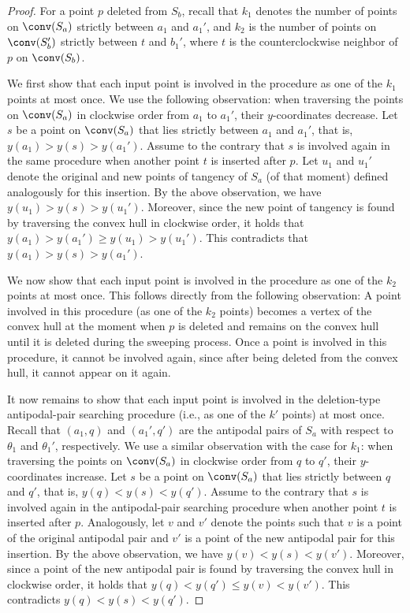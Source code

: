 \begin{proof}
    For a point $p$ deleted from $S_b$, recall that $k_1$ denotes the number of points on $\conv(S_a)$ strictly between $a_1$ and $a_1'$, and $k_2$ is the number of points on $\conv(S_b')$ strictly between $t$ and $b_1'$, where $t$ is the counterclockwise neighbor of $p$ on $\conv(S_b)$.

    We first show that each input point is involved in the procedure as one of the $k_1$ points at most once. 
    We use the following observation:
    when traversing the points on $\conv(S_a)$ in clockwise order from $a_1$ to $a_1'$, their $y$-coordinates decrease.
    Let $s$ be a point on $\conv(S_a)$ that lies strictly between $a_1$ and $a_1'$, that is, $y(a_1) > y(s) > y(a_1')$.
    Assume to the contrary that $s$ is involved again in the same procedure when another point $t$ is inserted after $p$.
    Let $u_1$ and $u_1'$ denote the original and new points of tangency of $S_a$ (of that moment) defined analogously for this insertion.
    By the above observation, we have $y(u_1) > y(s) > y(u_1')$.
    Moreover, since the new point of tangency is found by traversing the convex hull in clockwise order, 
    it holds that $y(a_1) > y(a_1') \ge y(u_1) > y(u_1')$.
    This contradicts that $y(a_1) > y(s) > y(a_1')$.

    We now show that each input point is involved in the procedure as one of the $k_2$ points at most once. This follows directly from the following observation:
    A point involved in this procedure (as one of the $k_2$ points) becomes a vertex of the convex hull at the moment when $p$ is deleted and remains on the convex hull until it is deleted during the sweeping process.
    Once a point is involved in this procedure, it cannot be involved again, since after being deleted from the convex hull, it cannot appear on it again.

    It now remains to show that each input point is involved in the deletion-type antipodal-pair searching procedure (i.e., as one of the $k'$ points) at most once.
    Recall that $(a_1, q)$ and $(a_1', q')$ are the antipodal pairs of $S_a$ with respect to $\theta_1$ and $\theta_1'$, respectively.
    We use a similar observation with the case for $k_1$: when traversing the points on $\conv(S_a)$ in clockwise order from $q$ to $q'$, their $y$-coordinates increase.
    Let $s$ be a point on $\conv(S_a)$ that lies strictly between $q$ and $q'$, that is, $y(q) < y(s) < y(q')$.
    Assume to the contrary that $s$ is involved again in the antipodal-pair searching procedure when another point $t$ is inserted after $p$.
    Analogously, let $v$ and $v'$ denote the points such that $v$ is a point of the original antipodal pair and $v'$ is a point of the new antipodal pair for this insertion.
    By the above observation, we have $y(v) < y(s) < y(v')$.
    Moreover, since a point of the new antipodal pair is found by traversing the convex hull in clockwise order, 
    it holds that $y(q) < y(q') \le y(v) < y(v')$.
    This contradicts $y(q) < y(s) < y(q')$.    
\end{proof}



